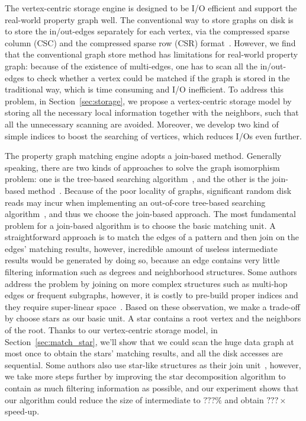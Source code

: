 The vertex-centric storage engine is designed to be I/O efficient and support the real-world property graph well.
The conventional way to store graphs on disk is to store the in/out-edges separately for each vertex,
via the compressed sparse column (CSC) and the compressed sparse row (CSR) format~\cite{DBLP:conf/sc/PearceGA10}.
However, we find that the conventional graph store method has limitations for real-world property graph:
because of the existence of multi-edges,
one has to scan all the in/out-edges to check whether a vertex could be matched if the graph is stored in the traditional way, which is time consuming and I/O inefficient.
To address this problem, in Section~\ref{sec:storage},
we propose a vertex-centric storage model by storing all the necessary local information together with the neighbors,
such that all the unnecessary scanning are avoided.
Moreover, we develop two kind of simple indices to boost the searching of vertices, which reduces I/Os even further.

The property graph matching engine adopts a join-based method.
Generally speaking, there are two kinds of approaches to solve the graph isomorphism problem:
one is the tree-based searching algorithm~\cite{DBLP:journals/jacm/Ullmann76,DBLP:conf/sigmod/HanLL13}, and the other is the join-based method~\cite{DBLP:journals/pvldb/LaiQLC15,DBLP:journals/pvldb/QiaoZC17,DBLP:journals/pvldb/MhedhbiS19}.
Because of the poor locality of graphs, significant random disk reads may incur when implementing an out-of-core tree-based searching algorithm~\cite{DBLP:conf/sigmod/KimLBHLKJ16}, and thus we choose the join-based approach.
The most fundamental problem for a join-based algorithm is to choose the basic matching unit.
A straightforward approach is to match the edges of a pattern and then join on the edges' matching results,
however, incredible amount of useless intermediate results would be generated by doing so,
because an edge contains very little filtering information such as degrees and neighborhood structures.
Some authors address the problem by joining on more complex structures such as multi-hop edges or frequent subgraphs,
however, it is costly to pre-build proper indices and they require super-linear space~\cite{DBLP:journals/pvldb/SunWWSL12}.
Based on these observation, we make a trade-off by choose stars as our basic unit.
A star contains a root vertex and the neighbors of the root.
Thanks to our vertex-centric storage model, in Section~\ref{sec:match_star}, we'll show that we could scan the huge data graph at most once to obtain the stars' matching results, and all the disk accesses are sequential.
Some authors also use star-like structures as their join unit~\cite{DBLP:journals/pvldb/SunWWSL12,DBLP:journals/pvldb/LaiQLC15}, however, we take more steps further by improving the star decomposition algorithm to contain as much filtering information as possible, and our experiment shows that our algorithm could reduce the size of intermediate to $???\%$ and obtain $???\times$ speed-up.

